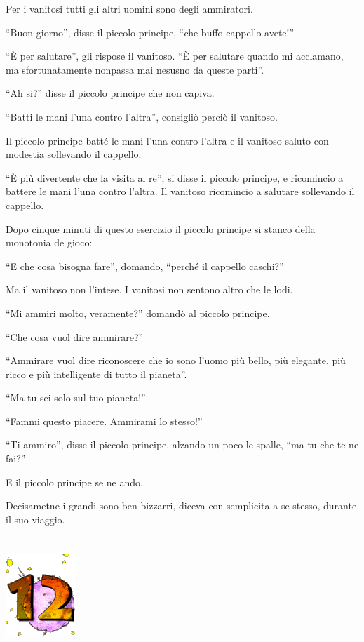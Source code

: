 \documentclass[11pt]{scrbook}
\begin{document}
Per i vanitosi tutti gli altri uomini sono degli ammiratori.

``Buon giorno'', disse il piccolo principe, ``che buffo cappello
avete!''

``È per salutare'', gli rispose il vanitoso. ``È per salutare quando mi
acclamano, ma sfortunatamente nonpassa mai nesusno da queste parti''.

``Ah si?'' disse il piccolo principe che non capiva.

``Batti le mani l'una contro l'altra'', consigliò perciò il vanitoso.

Il piccolo principe batté le mani l'una contro l'altra e il vanitoso
saluto con modestia sollevando il cappello.

``È più divertente che la visita al re'', si disse il piccolo principe,
e ricomincio a battere le mani l'una contro l'altra. Il vanitoso
ricomincio a salutare sollevando il cappello.

Dopo cinque minuti di questo esercizio il piccolo principe si stanco
della monotonia de gioco:

``E che cosa bisogna fare'', domando, ``perché il cappello caschi?''

Ma il vanitoso non l'intese. I vanitosi non sentono altro che le lodi.

``Mi ammiri molto, veramente?'' domandò al piccolo principe.

``Che cosa vuol dire ammirare?''

``Ammirare vuol dire riconoscere che io sono l'uomo più bello, più
elegante, più ricco e più intelligente di tutto il pianeta''.

``Ma tu sei solo sul tuo pianeta!''

``Fammi questo piacere. Ammirami lo stesso!''

``Ti ammiro'', disse il piccolo principe, alzando un poco le spalle,
``ma tu che te ne fai?''

E il piccolo principe se ne ando.

Decisametne i grandi sono ben bizzarri, diceva con semplicita a se
stesso, durante il suo viaggio.

\chapter{}
\begin{center}
\includegraphics{img/chapter12}
\end{center}
\end{document}
